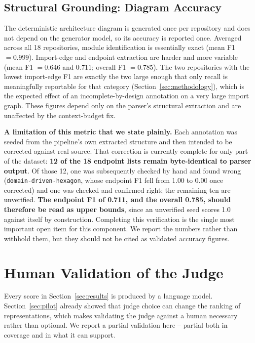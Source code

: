 \documentclass[conference]{IEEEtran}
\begin{document}
\subsection{Structural Grounding: Diagram Accuracy}
\label{sec:results-diagram}
The deterministic architecture diagram is generated once per repository and does not depend on
the generator model, so its accuracy is reported once. Averaged across all 18 repositories,
module identification is essentially exact (mean F1 $=0.999$). Import-edge and endpoint
extraction are harder and more variable (mean F1 $=0.646$ and $0.711$; overall F1 $=0.785$). The
two repositories with the lowest import-edge F1 are exactly the two large enough that only
recall is meaningfully reportable for that category (Section~\ref{sec:methodology}), which is
the expected effect of an incomplete-by-design annotation on a very large import graph. These
figures depend only on the parser's structural extraction and are unaffected by the
context-budget fix.

\textbf{A limitation of this metric that we state plainly.} Each annotation was seeded from the
pipeline's own extracted structure and then intended to be corrected against real source. That
correction is currently complete for only part of the dataset: \textbf{12 of the 18 endpoint
lists remain byte-identical to parser output}. Of those 12, one was subsequently checked by hand
and found wrong (\texttt{domain-driven-hexagon}, whose endpoint F1 fell from 1.00 to 0.00 once
corrected) and one was checked and confirmed right; the remaining ten are unverified.
\textbf{The endpoint F1 of 0.711, and the overall 0.785, should therefore be read as upper
bounds}, since an unverified seed scores 1.0 against itself by construction. Completing this
verification is the single most important open item for this component. We report the numbers
rather than withhold them, but they should not be cited as validated accuracy figures.

\section{Human Validation of the Judge}
\label{sec:human}

Every score in Section~\ref{sec:results} is produced by a language model. Section~\ref{sec:pilot}
already showed that judge choice can change the ranking of representations, which makes
validating the judge against a human necessary rather than optional. We report a partial
validation here -- partial both in coverage and in what it can support.
\end{document}
